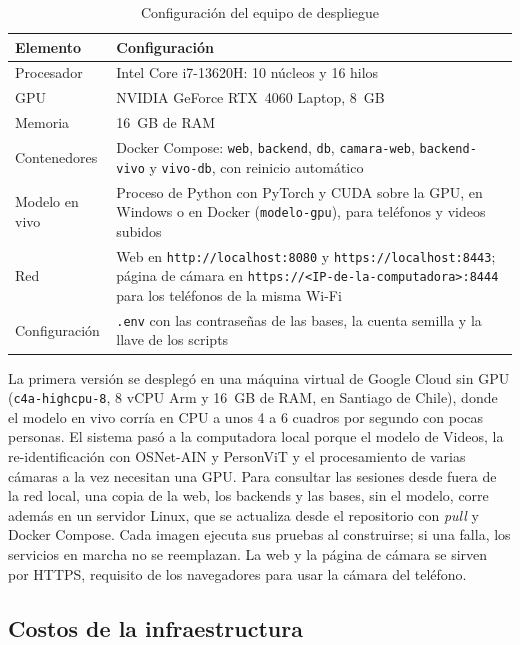 \documentclass[12pt,a4paper]{article}
\begin{document}
\begin{table}[H]
\caption{Configuración del equipo de despliegue}
\label{tab:infra}
\centering
\footnotesize
\renewcommand{\arraystretch}{1.15}
\begin{tabular}{|L{0.22\textwidth}|L{0.70\textwidth}|}
\hline
\textbf{Elemento} & \textbf{Configuración} \\
\hline
Procesador & Intel Core i7-13620H: 10 núcleos y 16 hilos \\
\hline
GPU & NVIDIA GeForce RTX~4060 Laptop, 8~GB \\
\hline
Memoria & 16~GB de RAM \\
\hline
Contenedores & Docker Compose: \texttt{web}, \texttt{backend}, \texttt{db}, \texttt{camara-web}, \texttt{backend-vivo} y \texttt{vivo-db}, con reinicio automático \\
\hline
Modelo en vivo & Proceso de Python con PyTorch y CUDA sobre la GPU, en Windows o en Docker (\texttt{modelo-gpu}), para teléfonos y videos subidos \\
\hline
Red & Web en \texttt{http://localhost:8080} y \texttt{https://localhost:8443}; página de cámara en \texttt{https://<IP-de-la-computadora>:8444} para los teléfonos de la misma Wi-Fi \\
\hline
Configuración & \texttt{.env} con las contraseñas de las bases, la cuenta semilla y la llave de los scripts \\
\hline
\end{tabular}
\end{table}

La primera versión se desplegó en una máquina virtual de Google Cloud sin GPU
(\texttt{c4a-highcpu-8}, 8 vCPU Arm y 16~GB de RAM, en Santiago de Chile),
donde el modelo en vivo corría en CPU a unos 4 a 6 cuadros por segundo con
pocas personas. El sistema pasó a la computadora local porque el modelo de
Videos, la re-identificación con OSNet-AIN y PersonViT y el procesamiento de
varias cámaras a la vez necesitan una GPU. Para consultar las sesiones desde
fuera de la red local, una copia de la web, los backends y las bases, sin el
modelo, corre además en un servidor Linux, que se actualiza desde el
repositorio con \textit{pull} y Docker Compose. Cada imagen ejecuta sus pruebas al
construirse; si una falla, los servicios en marcha no se reemplazan. La web y
la página de cámara se sirven por HTTPS, requisito de los navegadores para usar
la cámara del teléfono.

\subsection{Costos de la infraestructura}
\end{document}
